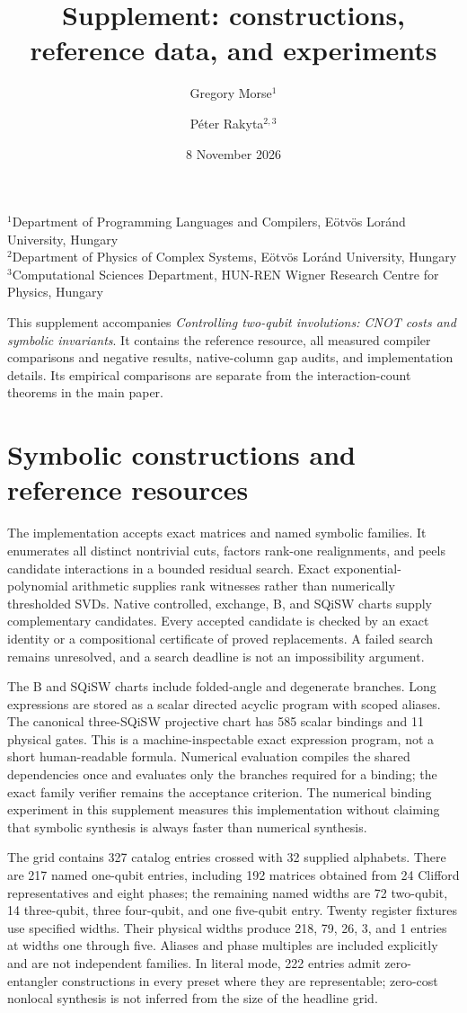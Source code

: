 \documentclass[11pt]{article}
\title{Supplement: constructions, reference data, and experiments}
\author{Gregory Morse$^{1}$ \and P\'eter Rakyta$^{2,3}$}
\date{8 November 2026}
\begin{document}
\maketitle
\begin{center}\small
$^1$Department of Programming Languages and Compilers, E\"otv\"os Lor\'and University, Hungary\\
$^2$Department of Physics of Complex Systems, E\"otv\"os Lor\'and University, Hungary\\
$^3$Computational Sciences Department, HUN-REN Wigner Research Centre for Physics, Hungary
\end{center}
This supplement accompanies \emph{Controlling two-qubit involutions:
CNOT costs and symbolic invariants}. It contains the reference resource,
all measured compiler comparisons and negative results, native-column gap
audits, and implementation details. Its empirical comparisons are separate
from the interaction-count theorems in the main paper.
\tableofcontents
\section{Symbolic constructions and reference resources}
The implementation accepts exact matrices and named symbolic families.
It enumerates all distinct nontrivial cuts, factors rank-one realignments,
and peels candidate interactions in a bounded residual search. Exact
exponential-polynomial arithmetic supplies rank witnesses rather than
numerically thresholded SVDs. Native controlled, exchange, B, and SQiSW
charts supply complementary candidates. Every accepted candidate is checked
by an exact identity or a compositional certificate of proved replacements.
A failed search remains unresolved, and a search deadline is not an
impossibility argument.

The B and SQiSW charts include folded-angle and degenerate branches.
Long expressions are stored as a scalar directed acyclic program with scoped
aliases. The canonical three-SQiSW projective chart has 585 scalar bindings
and 11 physical gates. This is a machine-inspectable exact expression
program, not a short human-readable formula. Numerical evaluation compiles
the shared dependencies once and evaluates only the branches required for
a binding; the exact family verifier remains the acceptance criterion.
The numerical binding experiment in this supplement measures this implementation without
claiming that symbolic synthesis is always faster than numerical synthesis.

The grid contains 327 catalog entries crossed with 32 supplied alphabets.
There are 217 named one-qubit entries, including 192 matrices obtained from
24 Clifford representatives and eight phases; the remaining named widths
are 72 two-qubit, 14 three-qubit, three four-qubit, and one five-qubit entry.
Twenty register fixtures use specified widths. Their physical widths produce
218, 79, 26, 3, and 1 entries at widths one through five. Aliases and phase
multiples are included explicitly and are not independent families.
In literal mode, 222 entries admit zero-entangler constructions in every preset
where they are representable; zero-cost nonlocal synthesis is not inferred
from the size of the headline grid.
\end{document}
